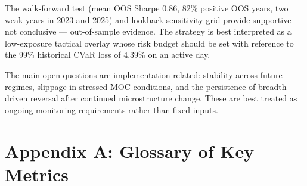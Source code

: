 \documentclass[11pt]{article}
\begin{document}
The walk-forward test (mean OOS Sharpe 0.86, 82\% positive OOS years, two
weak years in 2023 and 2025) and lookback-sensitivity grid provide
supportive --- not conclusive --- out-of-sample evidence. The strategy is
best interpreted as a low-exposure tactical overlay whose risk budget
should be set with reference to the 99\% historical CVaR loss of 4.39\%
on an active day.

The main open questions are implementation-related: stability across future
regimes, slippage in stressed MOC conditions, and the persistence of
breadth-driven reversal after continued microstructure change. These are
best treated as ongoing monitoring requirements rather than fixed inputs.

\newpage

\section*{Appendix A: Glossary of Key Metrics}
\end{document}
